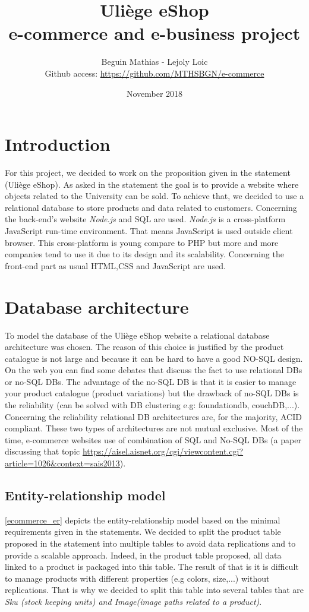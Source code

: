 \documentclass{article}
\title{Uliège eShop \\e-commerce and e-business project}
\author{Beguin Mathias - Lejoly Loic \\ Github access: \url{https://github.com/MTHSBGN/e-commerce}}
\date{November 2018}
\begin{document}
\maketitle
\newpage

\section{Introduction}
For this project, we decided to work on the proposition given in the statement (Uliège eShop). As asked in the statement the goal is to provide a website where objects related to the University can be sold. To achieve that, we decided to use a relational database to store products and data related to customers. Concerning the back-end's website \textit{Node.js} and SQL are used. \textit{Node.js} is a cross-platform JavaScript run-time environment. That means JavaScript is used outside client browser. This cross-platform is young compare to PHP but more and more companies tend to use it due to its design and its scalability. Concerning the front-end part as usual HTML,CSS and JavaScript are used.

\section{Database architecture}
To model the database of the Uliège eShop website a relational database architecture was chosen. The reason of this choice is justified by the product catalogue is not large and because it can be hard to have a good NO-SQL design. On the web you can find some debates that discuss the fact to use relational DBs or no-SQL DBs. The advantage of the no-SQL DB is that it is easier to manage your product catalogue (product variations) but the drawback of no-SQL DBs is the reliability (can be solved with DB clustering e.g: foundationdb, couchDB,...). Concerning the reliability relational DB architectures are, for the majority, ACID compliant. These two types of architectures are not mutual exclusive. Most of the time, e-commerce websites use of combination of SQL and No-SQL DBs (a paper discussing that topic \url{https://aisel.aisnet.org/cgi/viewcontent.cgi?article=1026&context=sais2013}).

\subsection{Entity-relationship model}
\autoref{ecommerce_er} depicts the entity-relationship model based on the minimal requirements given in the statements. We decided to split the product table proposed in the statement into multiple tables to avoid data replications and to provide a scalable approach. Indeed, in the product table proposed, all data linked to a product is packaged into this table. The result of that is it is difficult to manage products with different properties (e.g colors, size,...) without replications. That is why we decided to split this table into several tables that are \textit{Sku (stock keeping units) and Image(image paths related to a product)}. \\
\end{document}
